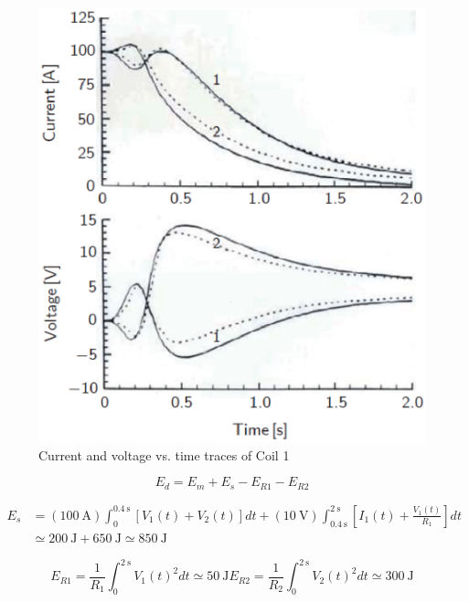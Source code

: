 \begin{figure}
	\centering
	\includegraphics[scale=0.6]{chpt8/figs/fig8.15.eps}
	\caption{Current and voltage vs. time traces of Coil 1 }
\end{figure}







\begin{equation}%
E_d=E_m+E_s-E_{R1}-E_{R2}
\end{equation}

\begin{align*}%
E_s&=(100\ \mathrm{A})\int_{0}^{0.4\ \mathrm{s}}[V_1(t)+V_2(t)]dt+(10\ \mathrm{V})\int_{0.4\ \mathrm{s}}^{2\ \mathrm{s}}\left[I_1(t)+\frac{V_1(t)}{R_1}\right]dt \\
&\simeq 200\ \mathrm{J}+650\ \mathrm{J}\simeq 850\ \mathrm{J}
\end{align*}


\begin{equation}%
E_{R1}=\frac{1}{R_1}\int_{0}^{2\ \mathrm{s}}V_1(t)^2dt\simeq 50\ \mathrm{J} 
E_{R2}=\frac{1}{R_2}\int_{0}^{2\ \mathrm{s}}V_2(t)^2dt\simeq 300\ \mathrm{J}
\end{equation}

